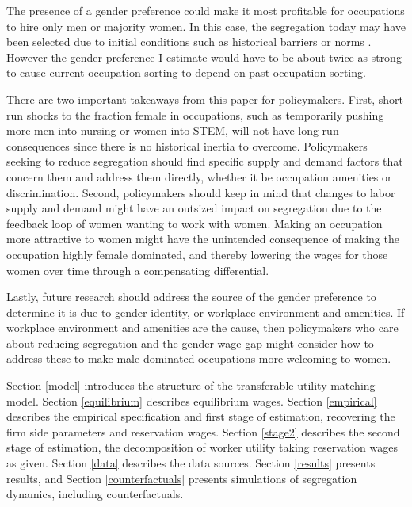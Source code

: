 \documentclass[12pt]{article}
\begin{document}
The presence of a gender preference could make it most profitable for occupations to hire only men or majority women. In this case, the segregation today may have been selected due to initial conditions such as historical barriers or norms \cite{Schelling1971, Pan2010}. However the gender preference I estimate would have to be about twice as strong to cause current occupation sorting to depend on past occupation sorting. 

There are two important takeaways from this paper for policymakers. First, short run shocks to the fraction female in occupations, such as temporarily pushing more men into nursing or women into STEM, will not have long run consequences since there is no historical inertia to overcome. Policymakers seeking to reduce segregation should find specific supply and demand factors that concern them and address them directly, whether it be occupation amenities or discrimination. Second, policymakers should keep in mind that changes to labor supply and demand might have an outsized impact on segregation due to the feedback loop of women wanting to work with women. Making an occupation more attractive to women might have the unintended consequence of making the occupation highly female dominated, and thereby lowering the wages for those women over time through a compensating differential. 

Lastly, future research should address the source of the gender preference to determine it is due to gender identity, or workplace environment and amenities. If workplace environment and amenities are the cause, then policymakers who care about reducing segregation and the gender wage gap might consider how to address these to make male-dominated occupations more welcoming to women.


 
Section \ref{model} introduces the structure of the transferable utility matching model. Section \ref{equilibrium} describes equilibrium wages. Section \ref{empirical} describes the empirical specification and first stage of estimation, recovering the firm side parameters and reservation wages. Section \ref{stage2} describes the second stage of estimation, the decomposition of worker utility taking reservation wages as given. Section \ref{data} describes the data sources. Section \ref{results} presents results, and Section \ref{counterfactuals} presents simulations of segregation dynamics, including counterfactuals.
\end{document}

